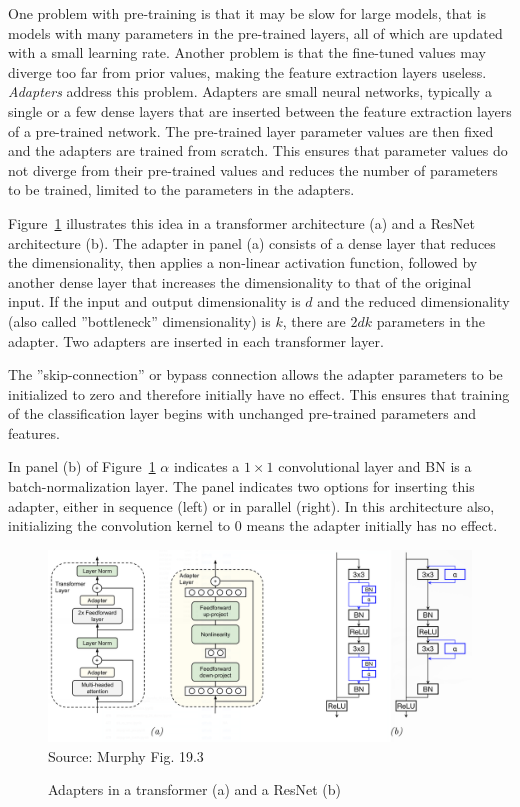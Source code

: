 One problem with pre-training is that it may be slow for large models, that is models with many parameters in the pre-trained layers, all of which are updated with a small learning rate. Another problem is that the fine-tuned values may diverge too far from prior values, making the feature extraction layers useless. \emph{Adapters} address this problem. Adapters are small neural networks, typically a single or a few dense layers that are inserted between the feature extraction layers of a pre-trained network. The pre-trained layer parameter values are then fixed and the adapters are trained from scratch. This ensures that parameter values do not diverge from their pre-trained values and reduces the number of parameters to be trained, limited to the parameters in the adapters. 

Figure~\ref{fig:murphy_19_03} illustrates this idea in a transformer architecture (a) and a ResNet architecture (b). The adapter in panel (a) consists of a dense layer that reduces the dimensionality, then applies a non-linear activation function, followed by another dense layer that increases the dimensionality to that of the original input. If the input and output dimensionality is $d$ and the reduced dimensionality (also called ''bottleneck'' dimensionality) is $k$, there are $2 d k$ parameters in the adapter. Two adapters are inserted in each transformer layer.

The ''skip-connection'' or bypass connection allows the adapter parameters to be initialized to zero and therefore initially have no effect. This ensures that training of the classification layer begins with unchanged pre-trained parameters and features. 

In panel (b) of Figure~\ref{fig:murphy_19_03} $\alpha$ indicates a $1 \times 1$ convolutional layer and BN is a batch-normalization layer. The panel indicates two options for inserting this adapter, either in sequence (left) or in parallel (right). In this architecture also, initializing the convolution kernel to $0$ means the adapter initially has no effect. 

\begin{figure}
\centering
\includegraphics[width=\textwidth]{murphy_19_03.png} \\
\scriptsize Source: Murphy Fig. 19.3 \normalsize
\caption{Adapters in a transformer (a) and a ResNet (b)}
\label{fig:murphy_19_03}
\end{figure}


